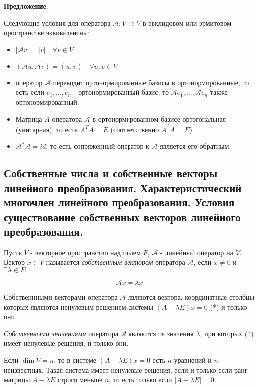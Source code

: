 \documentclass[a4paper]{article}
\begin{document}
\begin{htheorem}\textbf{Предложение}.

Следующие условия для оператора $\mathcal{A}: V \rightarrow V$ в евклидовом или эрмитовом пространстве эквивалентны:

\begin{itemize}
\item $|\mathcal{A} v| = |v| \quad \forall v \in V$
\item $(\mathcal{A} u, \mathcal{A} v) = (u,v) \quad \forall u, v \in V$
\item оператор $\mathcal{A}$ переводит ортонормированные базисы в ортонормированные, то есть если $e_1, ..., e_n$ - ортонормированный базис, то $\mathcal{A} e_1, ..., \mathcal{A} e_n$ также ортонормированный.
\item Матрица $A$ оператора $\mathcal{A}$ в ортонормированном базисе ортогональная (унитарная), то есть $A^TA=E$ (соответственно $\overline{A}^TA=E$)
\item $\mathcal{A}^* \mathcal{A} =  id$, то есть сопряжённый оператор к $\mathcal{A}$ является его обратным.
\end{itemize}
\end{htheorem}


\subsection*{Собственные числа и собственные векторы линейного преобразования. Характеристический многочлен линейного преобразования. Условия существование собственных векторов линейного преобразования.}

Пусть $V$ - векторное пространство над полем $F$, $\mathcal{A}$ - линейный оператор на $V$. Вектор $x \in V$ называется \textit{собственным вектором} оператора $\mathcal{A}$, если $x \neq 0$ и $\exists \lambda \in F:$

\[ \mathcal{A} x = \lambda x \]

Собственнными векторами оператора $\mathcal{A}$ являются вектора, координатные столбцы которых являются ненулевым решением системы $(A-\lambda E)x=0$ (*) и только они.

\textit{Собственными значениями} оператора $\mathcal{A}$ являются те значения $\lambda$, при которых (*) имеет ненулевые решения, и только они.

Если $\dim V = n$, то в системе $(A-\lambda E)x = 0$ есть $n$ уравнений и $n$ неизвестных. Такая система имеет ненулевые решения, если и только если ранг матрицы $A-\lambda E$ строго меньше $n$, то есть только если $|A-\lambda E| = 0$.
\end{document}
